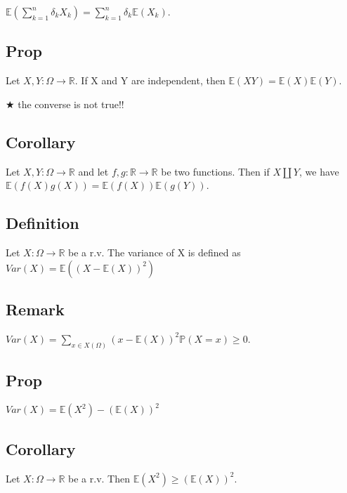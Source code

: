             \vspace{5pt}

            \centerline{$\mathbb{E}(\displaystyle\sum_{k=1}^n\delta_k X_k) = \sum_{k=1}^n \delta_k \mathbb{E}(X_k)$.}

        \subsection{Prop}
            Let $X,Y:\Omega\rightarrow\mathbb{R}$. If X and Y are independent, then $\mathbb{E}(XY)=\mathbb{E}(X)\mathbb{E}(Y)$.

            \vspace{5pt}

            $\bigstar$ the converse is not true!!

        \subsection{Corollary}
            Let $X,Y:\Omega\rightarrow\mathbb{R}$ and let $f,g:\mathbb{R}\rightarrow\mathbb{R}$ be two functions. Then if $X\coprod Y$, we have $\mathbb{E}(f(X)g(X)) = \mathbb{E}(f(X))\mathbb{E}(g(Y))$.

        \subsection{Definition}
            Let $X:\Omega\rightarrow\mathbb{R}$ be a r.v. The variance of X is defined as \\ $Var(X) = \mathbb{E}((X-\mathbb{E}(X))^2)$

        \subsection{Remark}
        $Var(X)=\displaystyle\sum_{x\in X(\Omega)} (x-\mathbb{E}(X))^2\mathbb{P}(X=x)\geq 0$.

        \subsection{Prop}
            $Var(X)=\mathbb{E}(X^2) - (\mathbb{E}(X))^2$

        \subsection{Corollary}
            Let $X:\Omega\rightarrow\mathbb{R}$ be a r.v. Then $\mathbb{E}(X^2)\geq (\mathbb{E}(X))^2$.

